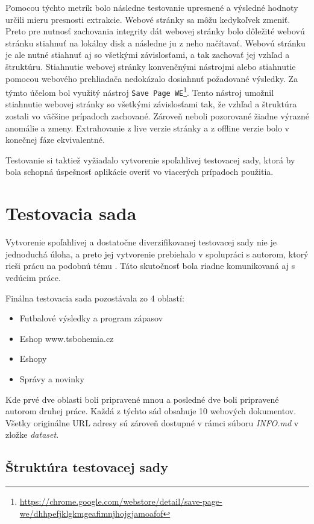Pomocou týchto metrík bolo následne testovanie upresnené a výsledné hodnoty určili mieru presnosti extrakcie. Webové stránky sa môžu kedykoľvek zmeniť. Preto pre nutnosť zachovania integrity dát webovej stránky bolo dôležité webovú stránku stiahnuť na lokálny disk a následne ju z neho načítavať. Webovú stránku je ale nutné stiahnuť aj so všetkými závislosťami, a tak zachovať jej vzhľad a štruktúru. Stiahnutie webovej stránky konvenčnými nástrojmi alebo stiahnutie pomocou webového prehliadača nedokázalo dosiahnuť požadované výsledky. Za týmto účelom bol využitý nástroj \texttt{Save Page WE}\footnote{\url{https://chrome.google.com/webstore/detail/save-page-we/dhhpefjklgkmgeafimnjhojgjamoafof}}. Tento nástroj umožnil stiahnutie webovej stránky so všetkými závislosťami tak, že vzhľad a štruktúra zostali vo väčšine prípadoch zachované. Zároveň neboli pozorované žiadne výrazné anomálie a zmeny. Extrahovanie z live verzie stránky a z offline verzie bolo v konečnej fáze ekvivalentné. 

Testovanie si taktiež vyžiadalo vytvorenie spoľahlivej testovacej sady, ktorá by bola schopná úspešnosť aplikácie overiť vo viacerých prípadoch použitia. 

\section{Testovacia sada}
\label{dataset}

Vytvorenie spoľahlivej a dostatočne diverzifikovanej testovacej sady nie je jednoduchá úloha, a preto jej vytvorenie prebiehalo v spolupráci s autorom, ktorý rieši prácu na podobnú tému \cite{mastera}. Táto skutočnosť bola riadne komunikovaná aj s vedúcim práce.

Finálna testovacia sada pozostávala zo 4 oblastí:

\begin{itemize}
    \item Futbalové výsledky a program zápasov
    \item Eshop www.tsbohemia.cz
    \item Eshopy
    \item Správy a novinky
\end{itemize}

Kde prvé dve oblasti boli pripravené mnou a posledné dve boli pripravené autorom druhej práce. Každá z týchto sád obsahuje 10 webových dokumentov. Všetky originálne URL adresy sú zároveň dostupné v rámci súboru \textit{INFO.md} v zložke \textit{dataset}.

\subsection{Štruktúra testovacej sady}

